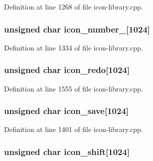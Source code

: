 Definition at line 1268 of file icon-\/library.cpp.

\hypertarget{icon-library_8cpp_a03e82d828cc979e7ad4f5fdd9fadc5e4}{
\subsubsection[{icon\_\-number\_\-8}]{\setlength{\rightskip}{0pt plus 5cm}unsigned char {\bf icon\_\-number\_}\mbox{[}1024\mbox{]}}}
\label{icon-library_8cpp_a03e82d828cc979e7ad4f5fdd9fadc5e4}


Definition at line 1334 of file icon-\/library.cpp.

\hypertarget{icon-library_8cpp_aa3ab9b1ea31f6b609ed747e7c5aa3591}{
\subsubsection[{icon\_\-redo}]{\setlength{\rightskip}{0pt plus 5cm}unsigned char {\bf icon\_\-redo}\mbox{[}1024\mbox{]}}}
\label{icon-library_8cpp_aa3ab9b1ea31f6b609ed747e7c5aa3591}


Definition at line 1555 of file icon-\/library.cpp.

\hypertarget{icon-library_8cpp_a06566499a4fb44a07cc0ca346e79bdbe}{
\subsubsection[{icon\_\-save}]{\setlength{\rightskip}{0pt plus 5cm}unsigned char {\bf icon\_\-save}\mbox{[}1024\mbox{]}}}
\label{icon-library_8cpp_a06566499a4fb44a07cc0ca346e79bdbe}


Definition at line 1401 of file icon-\/library.cpp.

\hypertarget{icon-library_8cpp_a6ad47e3fa3c2e9f68b3e1de5d49b9b61}{
\subsubsection[{icon\_\-shift}]{\setlength{\rightskip}{0pt plus 5cm}unsigned char {\bf icon\_\-shift}\mbox{[}1024\mbox{]}}}
\label{icon-library_8cpp_a6ad47e3fa3c2e9f68b3e1de5d49b9b61}


